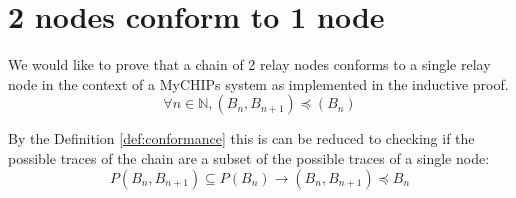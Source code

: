 \documentclass[runningheads]{llncs}
\newcommand{\tracestruc}[1]{\mathds{T}(#1)}
\newif\ifcomments
\newcommand{\egm}[1]{\ifcomments\textcolor{orange}{egm: #1}\fi}
\begin{document}
%
%
%

\section{2 nodes conform to 1 node}
\label{chap:coq_results}

We would like to prove that a chain of 2 relay nodes conforms to a single relay node in the context of a MyCHIPs system as implemented in the inductive proof.
$$\forall n \in \mathds{N}, (B_n, B_{n+1}) \preceq (B_n)
$$

By the Definition \ref{def:conformance} this is can be reduced to checking if the possible traces of the chain are a subset of the possible traces of a single node:
$$P(B_n, B_{n+1}) \subseteq P(B_n) \longrightarrow (B_n, B_{n+1}) \preceq B_n$$
\end{document}
